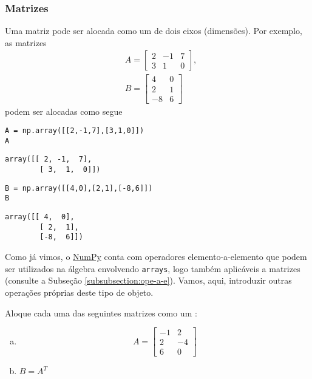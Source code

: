 \documentclass[12pt]{article}
\begin{document}
\subsubsection{Matrizes}\label{sec_alglin}

Uma matriz pode ser alocada como um {\PYTHONnumpyDOTarray} de dois eixos (dimensões). Por exemplo, as matrizes
\begin{align}
  &A =
  \begin{bmatrix}
    2 & -1 & 7\\
    3 & 1 & 0
  \end{bmatrix},\label{sec_alglin:eq:A}\\
  &B =
  \begin{bmatrix}
    4 & 0\\
    2 & 1\\
   -8 & 6
  \end{bmatrix}\label{sec_alglin:eq:B}
\end{align}
podem ser alocadas como segue

\begin{lstlisting}
A = np.array([[2,-1,7],[3,1,0]])
A
\end{lstlisting}

\begin{verbatim}
array([[ 2, -1,  7],
        [ 3,  1,  0]])
\end{verbatim}

\begin{lstlisting}
B = np.array([[4,0],[2,1],[-8,6]])
B
\end{lstlisting}

\begin{verbatim}
array([[ 4,  0],
        [ 2,  1],
        [-8,  6]])
\end{verbatim}

Como já vimos, o \href{https://numpy.org/}{NumPy} conta com operadores elemento-a-elemento que podem ser utilizados na álgebra envolvendo \lstinline+arrays+, logo também aplicáveis a matrizes (consulte a Subseção \ref{subsubsection:ope-a-e}). Vamos, aqui, introduzir outras operações próprias deste tipo de objeto.

\begin{exr}
  Aloque cada uma das seguintes matrizes como um {\PYTHONnumpyDOTarray}:
  \begin{enumerate}[a)]
  \item
    \begin{equation}
      A =
      \begin{bmatrix}
        -1 & 2\\
        2 & -4\\
        6 & 0
      \end{bmatrix}
    \end{equation}
  \item $B = A^T$ 
  \end{enumerate}
\end{exr}
\end{document}
